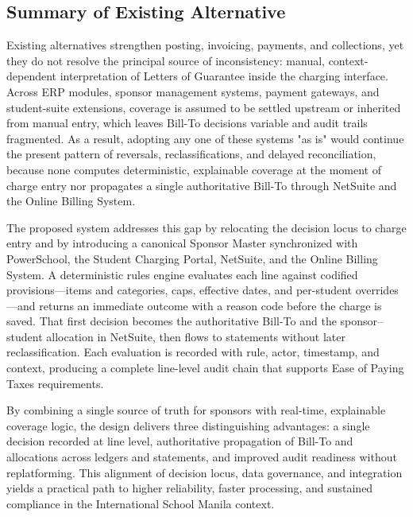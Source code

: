 \subsection{Summary of Existing Alternative}
Existing alternatives strengthen posting, invoicing, payments, and collections, yet they do not resolve the principal source of inconsistency: manual, context-dependent interpretation of Letters of Guarantee inside the charging interface. Across ERP modules, sponsor management systems, payment gateways, and student-suite extensions, coverage is assumed to be settled upstream or inherited from manual entry, which leaves Bill-To decisions variable and audit trails fragmented. As a result, adopting any one of these systems "as is" would continue the present pattern of reversals, reclassifications, and delayed reconciliation, because none computes deterministic, explainable coverage at the moment of charge entry nor propagates a single authoritative Bill-To through NetSuite and the Online Billing System.

The proposed system addresses this gap by relocating the decision locus to charge entry and by introducing a canonical Sponsor Master synchronized with PowerSchool, the Student Charging Portal, NetSuite, and the Online Billing System. A deterministic rules engine evaluates each line against codified provisions—items and categories, caps, effective dates, and per-student overrides—and returns an immediate outcome with a reason code before the charge is saved. That first decision becomes the authoritative Bill-To and the sponsor–student allocation in NetSuite, then flows to statements without later reclassification. Each evaluation is recorded with rule, actor, timestamp, and context, producing a complete line-level audit chain that supports Ease of Paying Taxes requirements.

By combining a single source of truth for sponsors with real-time, explainable coverage logic, the design delivers three distinguishing advantages: a single decision recorded at line level, authoritative propagation of Bill-To and allocations across ledgers and statements, and improved audit readiness without replatforming. This alignment of decision locus, data governance, and integration yields a practical path to higher reliability, faster processing, and sustained compliance in the International School Manila context.
